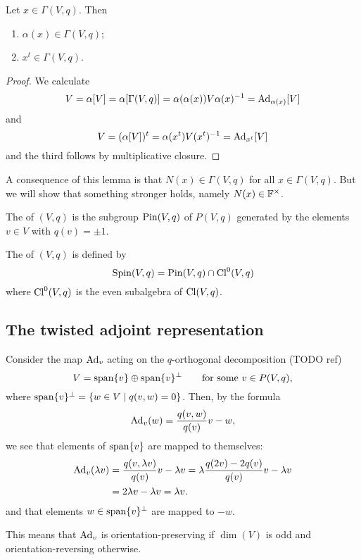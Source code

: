 \begin{lemma}
Let $x\in \Gamma(V,q)$. Then
\begin{enumerate}
\item $\alpha(x)\in \Gamma(V,q)$;
\item $x^t\in \Gamma(V,q)$.
\end{enumerate}
\end{lemma}
\begin{proof}
We calculate
\[ V = \alpha[V] = \alpha[\Gamma(V,q)] = \alpha(\alpha(x)) V \alpha(x)^{-1} = \operatorname{Ad}_{\alpha(x)}[V] \]
and
\[ V = (\alpha[V])^t = \alpha(x^t) V (x^t)^{-1} = \operatorname{Ad}_{x^t}[V] \]
and the third follows by multiplicative closure.
\end{proof}
A consequence of this lemma is that $N(x)\in \Gamma(V,q)$ for all $x\in \Gamma(V,q)$. But we will show that something stronger holds, namely $N(x)\in\mathbb{F}^\times$.

\begin{definition}
The  of $(V,q)$ is the subgroup $\operatorname{Pin}(V,q)$ of $P(V,q)$ generated by the elements $v\in V$ with $q(v) = \pm 1$.

The  of $(V,q)$ is defined by
\[ \operatorname{Spin}(V,q) = \operatorname{Pin}(V,q) \cap \operatorname{Cl}^0(V,q) \]
where $\operatorname{Cl}^0(V,q)$ is the even subalgebra of $\operatorname{Cl}(V,q)$.
\end{definition}

\subsection{The twisted adjoint representation}
Consider the map $\operatorname{Ad}_v$ acting on the $q$-orthogonal decomposition (TODO ref)
\[ V = \operatorname{span}\{v\}\oplus\operatorname{span}\{v\}^\perp \qquad \text{for some $v\in P(V,q)$,} \]
where $\operatorname{span}\{v\}^\perp = \left\{ w\in V \;\middle|\; q(v,w)=0 \right\}$. Then, by the formula
\[ \operatorname{Ad}_v(w) = \frac{q(v,w)}{q(v)}v - w ,\]
we see that elements of $\operatorname{span}\{v\}$ are mapped to themselves:
\begin{align*}
\operatorname{Ad}_v(\lambda v) &= \frac{q(v,\lambda v)}{q(v)}v - \lambda v = \lambda\frac{q(2v)-2q(v)}{q(v)}v - \lambda v \\
&= 2\lambda v -\lambda v = \lambda v.
\end{align*}
and that elements $w\in\operatorname{span}\{v\}^\perp$ are mapped to $-w$.

This means that $\operatorname{Ad}_v$ is orientation-preserving if $\dim(V)$ is odd and orientation-reversing otherwise.

